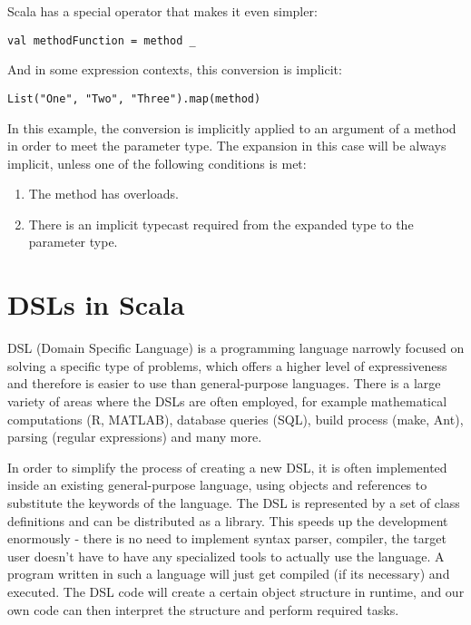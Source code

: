 Scala has a special operator that makes it even simpler:

\lstset{style=Scala}
\begin{lstlisting}
val methodFunction = method _
\end{lstlisting}

And in some expression contexts, this conversion is implicit:

\lstset{style=Scala}
\begin{lstlisting}
List("One", "Two", "Three").map(method)
\end{lstlisting}

In this example, the conversion is implicitly applied to an argument of a method in order to meet the parameter type. The expansion in this case will be always implicit, unless one of the following conditions is met:
\begin{enumerate}
	\item The method has overloads.
	\item There is an implicit typecast required from the expanded type to the parameter type.
\end{enumerate}





\section{DSLs in Scala}
\label{sec:dsls}

DSL (Domain Specific Language) is a programming language narrowly focused on solving a specific type of problems, which offers a higher level of expressiveness and therefore is easier to use than general-purpose languages. There is a large variety of areas where the DSLs are often employed, for example mathematical computations (R, MATLAB), database queries (SQL), build process (make, Ant), parsing (regular expressions) and many more.

In order to simplify the process of creating a new DSL, it is often implemented inside an existing general-purpose language, using objects and references to substitute the keywords of the language. The DSL is represented by a set of class definitions and can be distributed as a library. This speeds up the development enormously - there is no need to implement syntax parser, compiler, the target user doesn't have to have any specialized tools to actually use the language. A program written in such a language will just get compiled (if its necessary) and executed. The DSL code will create a certain object structure in runtime, and our own code can then interpret the structure and perform required tasks.

